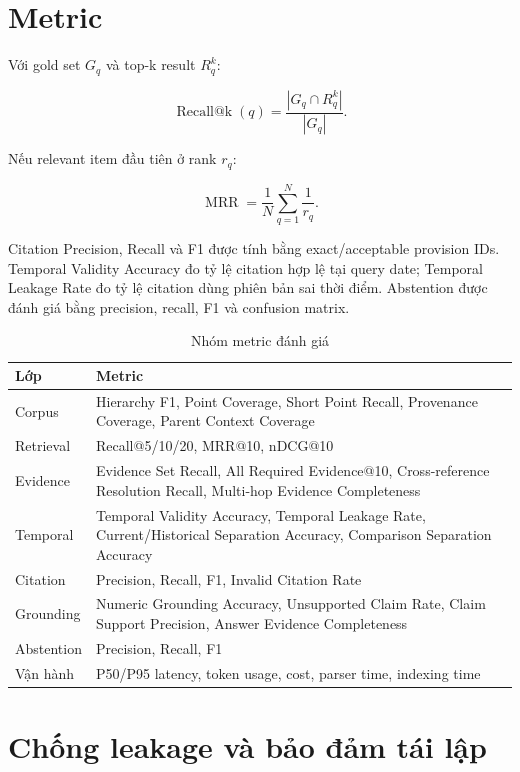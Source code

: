 \documentclass[a4paper,12pt]{extreport}
\begin{document}
\section{Metric}

Với gold set $G_q$ và top-k result $R_q^k$:

\begin{equation}
\operatorname{Recall@k}(q)=\frac{|G_q\cap R_q^k|}{|G_q|}.
\end{equation}

Nếu relevant item đầu tiên ở rank $r_q$:

\begin{equation}
\operatorname{MRR}=\frac{1}{N}\sum_{q=1}^{N}\frac{1}{r_q}.
\end{equation}

Citation Precision, Recall và F1 được tính bằng exact/acceptable provision IDs. Temporal Validity Accuracy đo tỷ lệ citation hợp lệ tại query date; Temporal Leakage Rate đo tỷ lệ citation dùng phiên bản sai thời điểm. Abstention được đánh giá bằng precision, recall, F1 và confusion matrix.

\begin{table}[H]
\caption{Nhóm metric đánh giá}
\begin{tabularx}{\textwidth}{p{3.2cm}X}
\toprule
\textbf{Lớp} & \textbf{Metric}\\
\midrule
Corpus & Hierarchy F1, Point Coverage, Short Point Recall, Provenance Coverage, Parent Context Coverage\\
Retrieval & Recall@5/10/20, MRR@10, nDCG@10\\
Evidence & Evidence Set Recall, All Required Evidence@10, Cross-reference Resolution Recall, Multi-hop Evidence Completeness\\
Temporal & Temporal Validity Accuracy, Temporal Leakage Rate, Current/Historical Separation Accuracy, Comparison Separation Accuracy\\
Citation & Precision, Recall, F1, Invalid Citation Rate\\
Grounding & Numeric Grounding Accuracy, Unsupported Claim Rate, Claim Support Precision, Answer Evidence Completeness\\
Abstention & Precision, Recall, F1\\
Vận hành & P50/P95 latency, token usage, cost, parser time, indexing time\\
\bottomrule
\end{tabularx}
\end{table}

\section{Chống leakage và bảo đảm tái lập}
\end{document}
